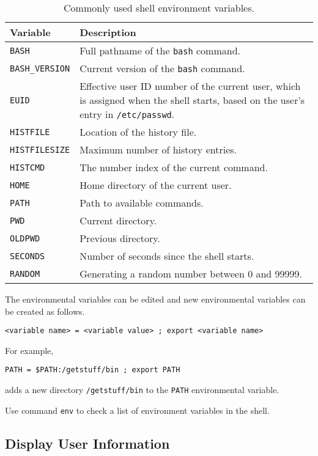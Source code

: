 \begin{table}
	\centering \caption{Commonly used shell environment variables.}\label{ch2tab:shellenvironmentvars}
	\begin{tabularx}{\textwidth}{lX}
		\hline
		Variable & Description \\ \hline
		\verb|BASH| & Full pathname of the \verb|bash| command. \\ \hdashline
		\verb|BASH_VERSION| & Current version of the \verb|bash| command. \\ \hdashline
		\verb|EUID| & Effective user ID number of the current user, which is assigned when the shell starts, based on the user's entry in \verb|/etc/passwd|. \\ \hdashline
		\verb|HISTFILE| & Location of the history file. \\ \hdashline
		\verb|HISTFILESIZE| & Maximum number of history entries. \\ \hdashline
		\verb|HISTCMD| & The number index of the current command. \\ \hdashline
		\verb|HOME| & Home directory of the current user. \\ \hdashline
		\verb|PATH| & Path to available commands. \\ \hdashline
		\verb|PWD| & Current directory. \\ \hdashline
		\verb|OLDPWD| & Previous directory. \\ \hdashline
		\verb|SECONDS| & Number of seconds since the shell starts. \\ \hdashline
		\verb|RANDOM| & Generating a random number between 0 and 99999. \\
		\hline
	\end{tabularx}
\end{table}

The environmental variables can be edited and new environmental variables can be created as follows.
\begin{lstlisting}
<variable name> = <variable value> ; export <variable name>
\end{lstlisting}

For example,
\begin{lstlisting}
PATH = $PATH:/getstuff/bin ; export PATH
\end{lstlisting}
adds a new directory \verb|/getstuff/bin| to the \verb|PATH| environmental variable.

Use command \verb|env| to check a list of environment variables in the shell.

\subsection{Display User Information}

